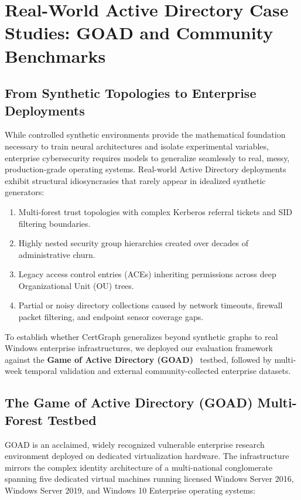 \chapter{Real-World Active Directory Case Studies: GOAD and Community Benchmarks}
\label{ch:case_study}

\section{From Synthetic Topologies to Enterprise Deployments}
While controlled synthetic environments provide the mathematical foundation necessary to train neural architectures and isolate experimental variables, enterprise cybersecurity requires models to generalize seamlessly to real, messy, production-grade operating systems. Real-world Active Directory deployments exhibit structural idiosyncrasies that rarely appear in idealized synthetic generators:
\begin{enumerate}
    \item Multi-forest trust topologies with complex Kerberos referral tickets and SID filtering boundaries.
    \item Highly nested security group hierarchies created over decades of administrative churn.
    \item Legacy access control entries (ACEs) inheriting permissions across deep Organizational Unit (OU) trees.
    \item Partial or noisy directory collections caused by network timeouts, firewall packet filtering, and endpoint sensor coverage gaps.
\end{enumerate}

To establish whether CertGraph generalizes beyond synthetic graphs to real Windows enterprise infrastructures, we deployed our evaluation framework against the \textbf{Game of Active Directory (GOAD)}~\cite{garla2020game} testbed, followed by multi-week temporal validation and external community-collected enterprise datasets.

\section{The Game of Active Directory (GOAD) Multi-Forest Testbed}
GOAD is an acclaimed, widely recognized vulnerable enterprise research environment deployed on dedicated virtualization hardware. The infrastructure mirrors the complex identity architecture of a multi-national conglomerate spanning five dedicated virtual machines running licensed Windows Server 2016, Windows Server 2019, and Windows 10 Enterprise operating systems:

